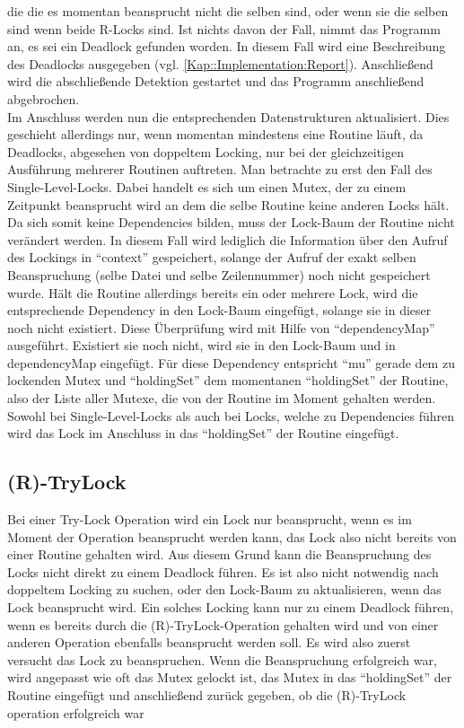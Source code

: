 die die es momentan beansprucht nicht die selben sind, oder wenn sie die selben 
sind wenn beide R-Locks sind. Ist nichts davon der Fall, nimmt das Programm an, 
es sei ein Deadlock gefunden worden. In diesem Fall wird eine Beschreibung des 
Deadlocks ausgegeben (vgl. \ref{Kap::Implementation:Report}). Anschließend wird 
die abschließende Detektion gestartet und das Programm anschließend abgebrochen.\\
Im Anschluss werden nun die entsprechenden Datenstrukturen aktualisiert. Dies geschieht 
allerdings nur, wenn momentan mindestens eine Routine läuft, da Deadlocks, abgesehen
von doppeltem Locking, nur bei der gleichzeitigen Ausführung mehrerer Routinen 
auftreten. Man betrachte zu erst den Fall des Single-Level-Locks. Dabei handelt es 
sich um einen Mutex, der zu einem Zeitpunkt beansprucht wird an dem die 
selbe Routine keine anderen Locks hält. Da sich somit keine Dependencies bilden,
muss der Lock-Baum der Routine nicht verändert werden. In diesem Fall wird 
lediglich die Information über den Aufruf des Lockings in ``context'' gespeichert,
solange der Aufruf der exakt selben Beanspruchung (selbe Datei und selbe Zeilennummer)
noch nicht gespeichert wurde. Hält die Routine allerdings bereits ein oder 
mehrere Lock, wird die entsprechende Dependency in den Lock-Baum eingefügt,
solange sie in dieser noch nicht existiert. Diese Überprüfung wird mit Hilfe 
von ``dependencyMap'' ausgeführt. Existiert sie noch nicht, wird sie in den 
Lock-Baum und in dependencyMap eingefügt. Für diese Dependency entspricht ``mu''
gerade dem zu lockenden Mutex und ``holdingSet'' dem momentanen ``holdingSet'' 
der Routine, also der Liste aller Mutexe, die von der Routine im Moment gehalten 
werden.\\
Sowohl bei Single-Level-Locks als auch bei Locks, welche zu Dependencies führen
wird das Lock im Anschluss in das ``holdingSet'' der Routine eingefügt.
\subsection{(R)-TryLock}
Bei einer Try-Lock Operation wird ein Lock nur beansprucht, wenn es im Moment 
der Operation beansprucht werden kann, das Lock also nicht bereits von einer Routine 
gehalten wird. Aus diesem Grund kann die Beanspruchung des Locks nicht direkt 
zu einem Deadlock führen. Es ist also nicht notwendig nach doppeltem Locking 
zu suchen, oder den Lock-Baum zu aktualisieren, wenn das Lock beansprucht wird.
Ein solches Locking kann nur zu einem Deadlock führen, wenn es bereits durch 
die (R)-TryLock-Operation gehalten wird und von einer anderen Operation ebenfalls 
beansprucht werden soll. Es wird also zuerst versucht das Lock zu beanspruchen.
Wenn die Beanspruchung erfolgreich war, wird angepasst wie oft das Mutex gelockt ist,
das Mutex in das ``holdingSet'' der Routine eingefügt und anschließend zurück 
gegeben, ob die (R)-TryLock operation erfolgreich war
